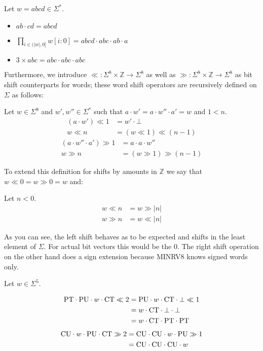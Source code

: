 \begin{example}
    Let $ w = abcd \in \Sigma^* $.
    \begin{itemize}
        \item $ ab \cdot cd = abcd $
        \item $ \prod_{i \in (|w|, 0]} w[i:0] = abcd \cdot abc \cdot ab \cdot a $
        \item $ 3 \times abc = abc \cdot abc \cdot abc $
    \end{itemize}
\end{example}

Furthermore, we introduce $ \ll : \Sigma^8 \times \mathbb{Z} \rightarrow \Sigma^8 $ as well as $ \gg : \Sigma^8 \times \mathbb{Z} \rightarrow \Sigma^8 $ as bit shift counterparts for words; these word shift operators are recursively defined on $ \Sigma $ as follows:

Let $ w \in \Sigma^8 $ and $ w', w'' \in \Sigma^* $ such that $ a \cdot w' = a \cdot w'' \cdot a' = w $ and $ 1 < n $.
\begin{align*}
    (a \cdot w') \ll 1 &= w' \cdot \bot \\
    w \ll n &= (w \ll 1) \ll (n - 1)
\end{align*}
\begin{align*}
    (a \cdot w'' \cdot a') \gg 1 &= a \cdot a \cdot w'' \\
    w \gg n &= (w \gg 1) \gg (n - 1)
\end{align*}

To extend this definition for shifts by amounts in $ \mathbb{Z} $ we say that $ w \ll 0 = w \gg 0 = w $ and:

Let $ n < 0 $.
\begin{align*}
    w \ll n &= w \gg |n| \\
    w \gg n &= w \ll |n|
\end{align*}

As you can see, the left shift behaves as to be expected and shifts in the least element of $ \Sigma $.
For actual bit vectors this would be the 0.
The right shift operation on the other hand does a sign extension because MINRV8 knows signed words only.

\begin{example}
    Let $ w \in \Sigma^5 $.

    \begin{align*}
        \text{PT} \cdot \text{PU} \cdot w \cdot \text{CT} \ll 2 &= \text{PU} \cdot w \cdot \text{CT} \cdot \bot \ll 1 \\
        &= w \cdot \text{CT} \cdot \bot \cdot \bot \\
        &= w \cdot \text{CT} \cdot \text{PT} \cdot \text{PT}
    \end{align*}
    \begin{align*}
        \text{CU} \cdot w \cdot \text{PU} \cdot \text{CT} \gg 2 &= \text{CU} \cdot \text{CU} \cdot w \cdot \text{PU} \gg 1 \\
        &= \text{CU} \cdot \text{CU} \cdot \text{CU} \cdot w
    \end{align*}
\end{example}

